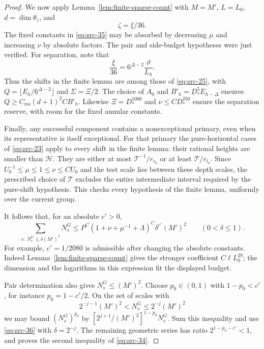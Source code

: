 \begin{proof}
We now apply Lemma~\ref{lem:finite-sparse-count} with $M=M'$,
$L=L_0$, $d=\dim\theta_z$, and
\[
 \zeta=\xi/36.
\]
The fixed constants in \eqref{eq:src-35} may be absorbed by
decreasing $\mu$ and increasing $\nu$ by absolute factors.
The pair and side-budget hypotheses were just verified.  For
separation, note that
\[
 \frac{\xi}{36}=6^{\Delta-2}\frac{\vartheta}{L_h}.
\]
Thus the shifts in the finite lemma are among those of
\eqref{eq:src-25}, with
$Q=\lfloor E_h/6^{\Delta-2}\rfloor$ and
$\Sigma=\Xi/2$.  The choice of $A_0$ and
$B'_h=D_*^5E_{h-\Delta}$ ensures
$Q\geq C_{\mathrm{res}}(d+1)^2 CB'_h$.
Likewise $\Xi=D_*^{1000}$ and $\nu\leq CD_*^{250}$ ensure
the separation reserve, with room for the fixed annular constants.

Finally, any successful component contains a nonexceptional
primary, even when its representative is itself exceptional.
For that primary the pure-horizontal cases of \eqref{eq:src-23}
apply to every shift in the finite lemma: their rational heights
are smaller than $\mathcal H$.  They are either at most
$\mathcal T^{-1}/r_{v_b}$ or at least
$\mathcal T/r_{t_b}$.  Since
$U_0^{-1}\leq\mu\leq1\leq\nu\leq CU_0$ and the test scale lies
between these depth scales, the prescribed choice of $\mathcal T$
excludes the entire intermediate interval required by the
pure-shift hypothesis.  This checks every hypothesis of the
finite lemma, uniformly over the current group.

It follows that, for an absolute $c'>0$,
\begin{equation*}
 \sum_{s:\ N_s^G\leq\delta(M')^2}N_s^G
 \leq P^C(1+\nu+\mu^{-1}+\Lambda)^C
                 \delta^{c'}(M')^2
 \qquad(0<\delta\leq1).
 \tag{36}\label{eq:src-36}
\end{equation*}
For example, $c'=1/2080$ is admissible after changing the absolute
constants.  Indeed Lemma~\ref{lem:finite-sparse-count} gives the
stronger coefficient $C\ell L_0^{29}$; the dimension and the
logarithms in this expression fit the displayed budget.

Pair determination also gives $N_s^G\leq(M')^2$.  Choose
$p_0\in(0,1)$ with $1-p_0<c'$, for instance
$p_0=1-c'/2$.  On the set of scales with
\[
 2^{-j-1}(M')^2<N_s^G\leq2^{-j}(M')^2
\]
we may bound $(N_s^G)^{p_0}$ by
$[2^{j+1}/(M')^2]^{1-p_0}N_s^G$.  Sum this inequality and use
\eqref{eq:src-36} with $\delta=2^{-j}$.  The remaining geometric
series has ratio $2^{1-p_0-c'}<1$, and proves the second inequality
of \eqref{eq:src-34}.
\end{proof}

